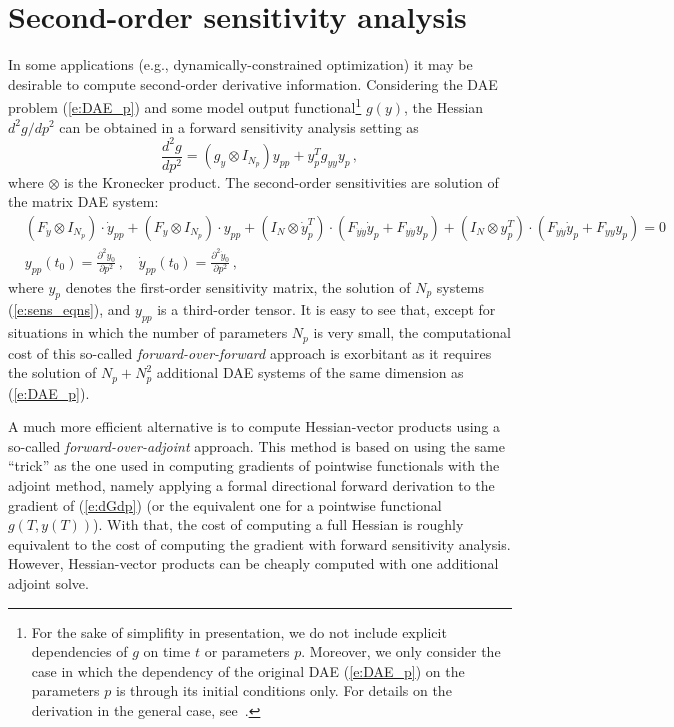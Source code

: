 \section{Second-order sensitivity analysis}\label{ss:hess_sensi}
In some applications (e.g., dynamically-constrained optimization) it may
be desirable to compute second-order derivative information. Considering
the DAE problem (\ref{e:DAE_p}) and some model output
functional\footnote{For the sake of simplifity in presentation, we do not
include explicit dependencies of $g$ on time $t$ or parameters $p$.
Moreover, we only consider the case in which the dependency of the
original DAE (\ref{e:DAE_p}) on the parameters $p$ is through its initial conditions only.
For details on the derivation in the general case, see~\cite{OzBa:05}.}
$g(y)$, the Hessian $d^2g/dp^2$ can be obtained in a forward sensitivity
analysis setting as
\begin{equation*}
\frac{d^2 g}{d p^2} = \left(g_y \otimes I_{N_p} \right ) y_{pp} + y_p^T g_{yy} y_p \, ,
\end{equation*}
where $\otimes$ is the Kronecker product. The second-order sensitivities are
solution of the matrix DAE system:
\begin{equation*}
  \begin{split}
  & \left( F_{\dot y} \otimes I_{N_p} \right) \cdot \dot y_{pp}  +
  \left( F_y        \otimes I_{N_p} \right) \cdot y_{pp}       +
  \left( I_N \otimes {\dot y}_p^T \right) \cdot \left( F_{\dot y \dot y} \dot y_p + F_{y \dot y} y_p \right) +
  \left( I_N \otimes y_p^T        \right) \cdot \left( F_{y \dot y}      \dot y_p + F_{y y}      y_p \right) = 0 \\
  & y_{pp}(t_0) = \frac{\partial^2 y_0}{\partial p^2} \, , \quad
  \dot y_{pp}(t_0) = \frac{\partial^2 \dot y_0}{\partial p^2} \, ,
  \end{split}
\end{equation*}
where $y_p$ denotes the first-order sensitivity matrix, the solution of $N_p$
systems (\ref{e:sens_eqns}), and $y_{pp}$ is a third-order tensor.
It is easy to see that, except for situations in which the number of parameters
$N_p$ is very small, the computational cost of this so-called {\em forward-over-forward}
approach is exorbitant as it requires the solution of $N_p + N_p^2$ additional
DAE systems of the same dimension as (\ref{e:DAE_p}).

A much more efficient alternative is to compute Hessian-vector products using
a so-called {\em forward-over-adjoint} approach. This method is based on using
the same ``trick'' as the one used in computing gradients of pointwise
functionals with the adjoint method, namely applying a formal directional forward
derivation to the gradient of (\ref{e:dGdp}) (or the equivalent one for a pointwise
functional $g(T, y(T))$). With that, the cost of computing a full Hessian is roughly
equivalent to the cost of computing the  gradient with forward sensitivity analysis.
However, Hessian-vector products can be cheaply computed with one additional adjoint solve.

